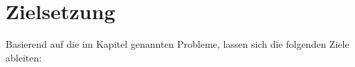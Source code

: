 

\section{Zielsetzung}\label{sec:zielsetzung}

Basierend auf die im Kapitel  genannten Probleme, lassen sich die folgenden Ziele ableiten:

